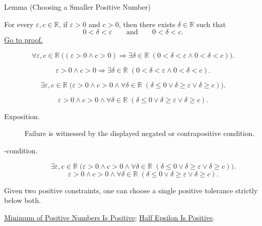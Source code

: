 \begin{lemmabox}{Lemma (Choosing a Smaller Positive Number)}
\begin{lemma}
\label{lem:choosing-a-smaller-positive-number}
For every $\varepsilon,c\in\mathbb{R}$, if $\varepsilon>0$ and $c>0$, then
there exists $\delta\in\mathbb{R}$ such that
\[
  0<\delta<\varepsilon
  \qquad\text{and}\qquad
  0<\delta<c.
\]
\hyperref[prf:choosing-a-smaller-positive-number]{Go to proof.}
\end{lemma}
\end{lemmabox}
\begin{remark*}
\[
\forall \varepsilon,c\in\mathbb{R}\;
\bigl((\varepsilon>0\land c>0)\Longrightarrow
\exists\delta\in\mathbb{R}\;(0<\delta<\varepsilon\land 0<\delta<c)\bigr).
\]
\end{remark*}
\begin{remark*}
\[
\varepsilon>0\land c>0
\Longrightarrow
\exists\delta\in\mathbb{R}\;(0<\delta<\varepsilon\land 0<\delta<c).
\]
\end{remark*}
\begin{remark*}
\[
\exists \varepsilon,c\in\mathbb{R}\;
\bigl(\varepsilon>0\land c>0\land
\forall\delta\in\mathbb{R}\;(\delta\leq 0\lor \delta\geq\varepsilon\lor \delta\geq c)\bigr).
\]
\end{remark*}
\begin{remark*}
\[
\varepsilon>0\land c>0\land
\forall\delta\in\mathbb{R}\;(\delta\leq 0\lor \delta\geq\varepsilon\lor \delta\geq c).
\]
\end{remark*}

\begin{remark*}
\begin{description}
  \item[Exposition.]
  Failure is witnessed by the displayed negated or contrapositive condition.

  \item[\exists-condition.]
  \[
\exists \varepsilon,c\in\mathbb{R}\;
\bigl(\varepsilon>0\land c>0\land
\forall\delta\in\mathbb{R}\;(\delta\leq 0\lor \delta\geq\varepsilon\lor \delta\geq c)\bigr).
\]
\[
\varepsilon>0\land c>0\land
\forall\delta\in\mathbb{R}\;(\delta\leq 0\lor \delta\geq\varepsilon\lor \delta\geq c).
\]
\end{description}
\end{remark*}
\begin{remark*}[Interpretation]
Given two positive constraints, one can choose a single positive tolerance
strictly below both.
\end{remark*}
\begin{dependencies}
\hyperref[lem:minimum-of-positive-numbers-is-positive]{Minimum of Positive Numbers Is Positive};
\hyperref[lem:half-epsilon-is-positive]{Half Epsilon Is Positive}.
\end{dependencies}

